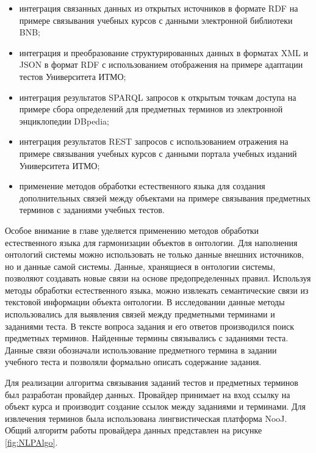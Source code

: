 \begin{itemize}
\item интеграция связанных данных из открытых источников в формате RDF на примере связывания учебных курсов с данными электронной библиотеки BNB;
\item интеграция и преобразование структурированных данных в форматах XML и JSON в формат RDF с использованием отображения на примере адаптации тестов Университета ИТМО;
\item интеграция результатов SPARQL запросов к открытым точкам доступа на примере сбора определений для предметных терминов из электронной энциклопедии DBpedia;
\item интеграция результатов REST запросов с использованием отражения на примере связывания учебных курсов с данными портала учебных изданий Университета ИТМО;
\item применение методов обработки естественного языка для создания дополнительных связей между объектами на примере связывания предметных терминов с заданиями учебных тестов.
\end{itemize}

Особое внимание в главе уделяется применению методов обработки естественного языка для гармонизации объектов в онтологии. Для наполнения онтологий системы можно использовать не только данные внешних источников, но и данные самой системы. Данные, хранящиеся в онтологии системы, позволяют создавать новые связи на основе предопределенных правил. Используя методы обработки естественного языка, можно извлекать семантические связи из текстовой информации объекта онтологии. В исследовании данные методы использовались для выявления связей между предметными терминами и заданиями теста. В тексте вопроса задания и его ответов производился поиск предметных терминов. Найденные термины связывались с заданиями теста. Данные связи обозначали использование предметного термина в задании учебного теста и позволяли формально описать содержание задания. 

Для реализации алгоритма связывания заданий тестов и предметных терминов был разработан провайдер данных. Провайдер принимает на вход ссылку на объект курса и производит создание ссылок между заданиями и терминами. Для извлечения терминов была использована лингвистическая платформа NooJ. Общий алгоритм работы провайдера данных представлен на рисунке \ref{fig:NLPAlgo}.

